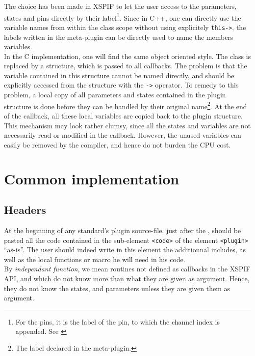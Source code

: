 \noindent The choice has been made in XSPIF to let the user access to the parameters, states and pins directly by their label\footnote{For the pins, it is the label of the pin, to which the channel index is appended. See \cite{xspif:userguide}}. Since in C++, one can directly use the variable names from within the class scope without using explicitely \verb|this->|, the labels written in the meta-plugin can be directly used to name the members variables.\\  

\noindent In the C implementation, one will find the same object oriented style. The class is replaced by a structure, which is passed to all callbacks. The problem is that the variable contained in this structure cannot be named directly, and should be explicitly accessed from the structure with the \verb|->| operator. To remedy to this problem, a local copy of all parameters and states contained in the plugin structure is done before they can be handled by their original name\footnote{The label declared in the meta-plugin.}. At the end of the callback, all these local variables are copied back to the plugin structure.\\
\noindent This mechanism may look rather clumsy, since all the states and variables are not necessarily read or modified in the callback. However, the unused variables can easily be removed by the compiler, and hence do not burden the CPU cost.\\

\section{Common implementation}

\subsection{Headers}
\noindent At the beginning of any standard's plugin source-file, just
after the , should be pasted all the code contained
in the sub-element \verb|<code>| of the element \verb|<plugin>| ``as-is''. The user
should indeed write in this element the additionnal includes, as well
as the local functions or macro he will need in his code.\\
\noindent By \emph{independant function}, we mean routines not defined
as callbacks in the XSPIF API, and which do not know more than what
they are given as argument. Hence, they do not know the states, and
parameters unless they are given them as argument.\\ 

